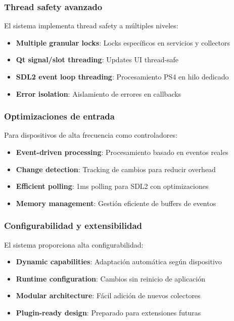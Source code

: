 \subsubsection{Thread safety avanzado}

El sistema implementa thread safety a múltiples niveles:
\begin{itemize}
    \item \textbf{Multiple granular locks}: Locks específicos en servicios y collectors
    \item \textbf{Qt signal/slot threading}: Updates UI thread-safe
    \item \textbf{SDL2 event loop threading}: Procesamiento PS4 en hilo dedicado
    \item \textbf{Error isolation}: Aislamiento de errores en callbacks
\end{itemize}

\subsubsection{Optimizaciones de entrada}

Para dispositivos de alta frecuencia como controladores:
\begin{itemize}
    \item \textbf{Event-driven processing}: Procesamiento basado en eventos reales
    \item \textbf{Change detection}: Tracking de cambios para reducir overhead
    \item \textbf{Efficient polling}: 1ms polling para SDL2 con optimizaciones
    \item \textbf{Memory management}: Gestión eficiente de buffers de eventos
\end{itemize}

\subsubsection{Configurabilidad y extensibilidad}

El sistema proporciona alta configurabilidad:
\begin{itemize}
    \item \textbf{Dynamic capabilities}: Adaptación automática según dispositivo
    \item \textbf{Runtime configuration}: Cambios sin reinicio de aplicación
    \item \textbf{Modular architecture}: Fácil adición de nuevos colectores
    \item \textbf{Plugin-ready design}: Preparado para extensiones futuras
\end{itemize}

